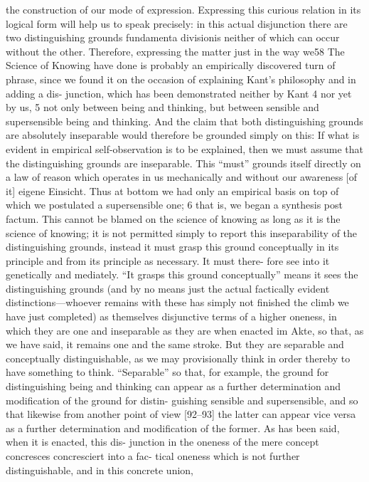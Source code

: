 the construction of our mode of expression. Expressing this curious relation in
its logical form will help us to speak precisely: in this actual disjunction there
are two distinguishing grounds {fundamenta divisionis} neither of which can
occur without the other. Therefore, expressing the matter just in the way we58
The Science of Knowing
have done is probably an empirically discovered turn of phrase, since we
found it on the occasion of explaining Kant’s philosophy and in adding a dis-
junction, which has been demonstrated neither by Kant 4 nor yet by us, 5 not
only between being and thinking, but between sensible and supersensible
being and thinking. And the claim that both distinguishing grounds are
absolutely inseparable would therefore be grounded simply on this: If what is
evident in empirical self-observation is to be explained, then we must assume
that the distinguishing grounds are inseparable. This “must” grounds itself
directly on a law of reason which operates in us mechanically and without our
awareness [of it] {eigene Einsicht}. Thus at bottom we had only an empirical
basis on top of which we postulated a supersensible one; 6 that is, we began a
synthesis post factum. This cannot be blamed on the science of knowing as
long as it is the science of knowing; it is not permitted simply to report this
inseparability of the distinguishing grounds, instead it must grasp this ground
conceptually in its principle and from its principle as necessary. It must there-
fore see into it genetically and mediately. “It grasps this ground conceptually”
means it sees the distinguishing grounds (and by no means just the actual
factically evident distinctions—whoever remains with these has simply not
finished the climb we have just completed) as themselves disjunctive terms of
a higher oneness, in which they are one and inseparable as they are when
enacted {im Akte}, so that, as we have said, it remains one and the same
stroke. But they are separable and conceptually distinguishable, as we may
provisionally think in order thereby to have something to think. “Separable”
so that, for example, the ground for distinguishing being and thinking can
appear as a further determination and modification of the ground for distin-
guishing sensible and supersensible, and so that likewise from another point
of view [92–93] the latter can appear vice versa as a further determination
and modification of the former. As has been said, when it is enacted, this dis-
junction in the oneness of the mere concept concresces {concresciert} into a fac-
tical oneness which is not further distinguishable, and in this concrete union,
